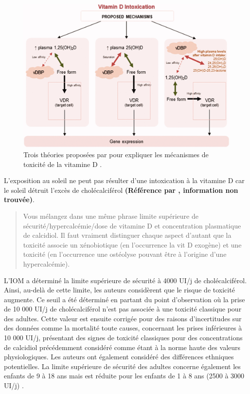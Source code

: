 \documentclass[
  a4paper,
  DIV=11,
  numbers=noendperiod,
  listof=totoc]{scrreprt}
\begin{document}
\begin{figure}

{\centering \includegraphics{figures/vd-intox-theory.jpg}

}

\caption[Trois théories proposées par \textcite{Jones.2008} pour
expliquer les mécanismes de toxicité de la vitamine
D.]{\label{fig-vd-intox-theory}Trois théories proposées par
\textcite{Jones.2008} pour expliquer les mécanismes de toxicité de la
vitamine D \autocite{Janoušek.2022}.}

\end{figure}

L'exposition au soleil ne peut pas résulter d'une intoxication à la
vitamine D car le soleil détruit l'excès de cholécalciférol
\textbf{(Référence \textcite{Mawer.1985} par \textcite{Alshahrani.2013},
information non trouvée)}.

\begin{quote}
Vous mélangez dans une même phrase limite supérieure de
sécurité/hypercalcémie/dose de vitamine D et concentration plasmatique
de calcidiol. Il faut vraiment distinguer chaque aspect d'autant que la
toxicité associe un xénobiotique (en l'occurrence la vit D exogène) et
une toxicité (en l'occurrence une ostéolyse pouvant être à l'origine
d'une hypercalcémie).
\end{quote}

L'\ac{IOM} a déterminé la limite supérieure de sécurité à 4000 UI/j de
cholécalciférol. Ainsi, au-delà de cette limite, les auteurs considèrent
que le risque de toxicité augmente. Ce seuil a été déterminé en partant
du point d'observation où la prise de 10 000 UI/j de cholécalciférol
n'est pas associée à une toxicité classique pour des adultes. Cette
valeur est ensuite corrigée pour des raisons d'incertitudes sur des
données comme la mortalité toute causes, concernant les prises
inférieures à 10 000 UI/j, présentant des signes de toxicité classiques
pour des concentrations de calcidiol précédemment considéré comme étant
à la norme haute des valeurs physiologiques. Les auteurs ont également
considéré des différences ethniques potentielles. La limite supérieure
de sécurité des adultes concerne également les enfants de 9 à 18 ans
mais est réduite pour les enfants de 1 à 8 ans (2500 à 3000 UI/j)
\autocite{IOM.2011}.
\end{document}
